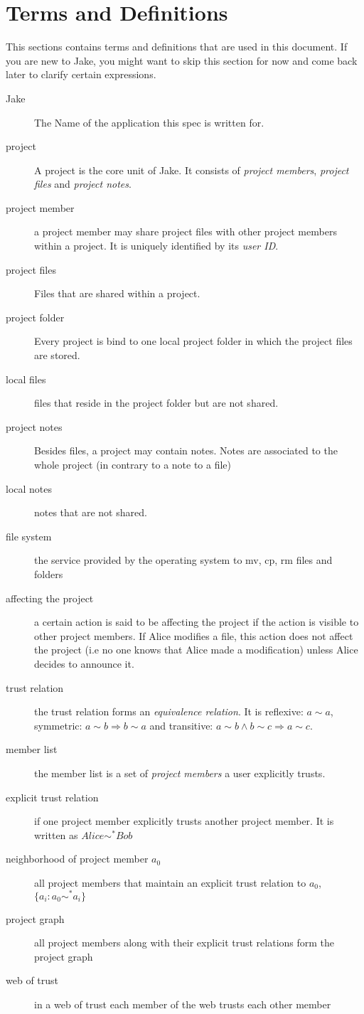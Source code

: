\section{Terms and Definitions}
This sections contains terms and definitions that are used in this document. If you are new to Jake, you might want to skip this section for now and come back later to clarify certain expressions.
\begin{description}

\item[Jake] The Name of the application this spec is written for.
\item[project] A project is the core unit of Jake. It consists of \emph{project members}, \emph{project files} and \emph{project notes}.
\item[project member] a project member may share project files with other project members within a project. It is uniquely identified by its \emph{user ID}.
\item[project files] Files that are shared within a project.
\item[project folder] Every project is bind to one local project folder in which the project files are stored.
\item[local files] files that reside in the project folder but are not shared.
\item[project notes] Besides files, a project may contain notes. Notes are associated to the whole project (in contrary to a note to a file)
\item[local notes] notes that are not shared.
\item[file system] the service provided by the operating system to mv, cp, rm files and folders
\item[affecting the project] a certain action is said to be affecting the project if the action is visible to other project members. If Alice modifies a file, this action does not affect the project (i.e no one knows that Alice made a modification) unless Alice decides to announce it.
\item[trust relation] the trust relation forms an \emph{equivalence relation}. It is reflexive: $a \sim a$, symmetric: $a \sim b \Rightarrow b \sim a$ and transitive: $a \sim b \wedge b \sim c \Rightarrow a \sim c$. 
\item[member list] the member list is a set of \emph{project members} a user explicitly trusts.
\item[explicit trust relation] if one project member explicitly trusts another project member. It is written as $Alice \sim ^* Bob$
\item[neighborhood of project member $a_0$] all project members that maintain an explicit trust relation to $a_0$, $\{a_i: a_0 \sim ^* a_i\}$

\item[project graph] all project members along with their explicit trust relations form the project graph
\item[web of trust] in a web of trust each member of the web trusts each other member

\end{description}
